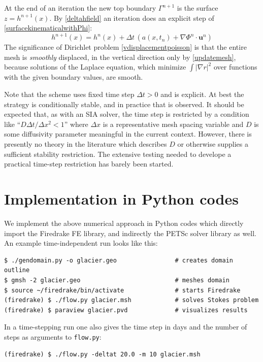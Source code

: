 \documentclass[letterpaper,final,12pt,reqno]{amsart}
\newcommand{\grad}{\nabla}
\newcommand{\bu}{\mathbf{u}}
\begin{document}
\medskip
At the end of an iteration the new top boundary $\Gamma^{n+1}$ is the surface $z=h^{n+1}(x)$.  By \eqref{deltahfield} an iteration does an explicit step of \eqref{surfacekinematicalwithPhi}:
    $$h^{n+1}(x) = h^n(x) + \Delta t\,\left(a(x,t_n) + \grad \Phi^n\cdot \bu^n\right)$$
The significance of Dirichlet problem \eqref{vdisplacementpoisson} is that the entire mesh is \emph{smoothly} displaced, in the vertical direction only by \eqref{updatemesh}, because solutions of the Laplace equation, which minimize $\int |\grad r|^2$ over functions with the given boundary values, are smooth.

Note that the scheme uses fixed time step $\Delta t > 0$ and is explicit.  At best the strategy is conditionally stable, and in practice that is observed.  It should be expected that, as with an SIA solver, the time step is restricted by a condition like ``$D\Delta t / \Delta x^2 < 1$'' where $\Delta x$ is a representative mesh spacing variable and $D$ is some diffusivity parameter meaningful in the current context.  However, there is presently no theory in the literature which describes $D$ or otherwise supplies a sufficient stability restriction.  The extensive testing needed to develope a practical time-step restriction has barely been started.


\section{Implementation in Python codes}

We implement the above numerical approach in Python codes which directly import the Firedrake FE library, and indirectly the PETSc solver library as well.  An example time-independent run looks like this:

\medskip
\begin{Verbatim}
$ ./gendomain.py -o glacier.geo                # creates domain outline
$ gmsh -2 glacier.geo                          # meshes domain
$ source ~/firedrake/bin/activate              # starts Firedrake
(firedrake) $ ./flow.py glacier.msh            # solves Stokes problem
(firedrake) $ paraview glacier.pvd             # visualizes results
\end{Verbatim}

\medskip
\noindent In a time-stepping run one also gives the time step in days and the number of steps as arguments to \texttt{flow.py}:

\medskip
\begin{Verbatim}
(firedrake) $ ./flow.py -deltat 20.0 -m 10 glacier.msh
\end{Verbatim}
\end{document}
